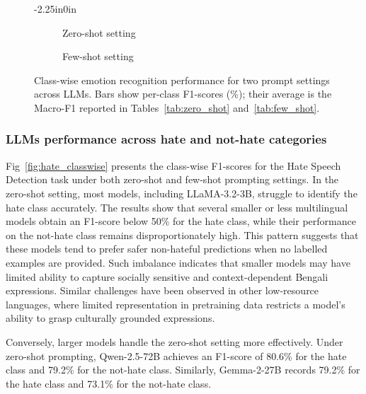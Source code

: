 \documentclass[10pt,letterpaper]{article}
\begin{document}
\begin{figure}[t]
\begin{adjustwidth}{-2.25in}{0in}
    \centering
    \begin{subfigure}{0.7\textwidth}
        \centering
        \caption{Zero-shot setting}
        \label{fig:emo_zero}
    \end{subfigure}
    \hfill
    \begin{subfigure}{0.7\textwidth}
        \centering
        \caption{Few-shot setting}
        \label{fig:emo_few}
    \end{subfigure}
    \caption{Class-wise emotion recognition performance for two prompt settings across LLMs. Bars show per-class F1-scores (\%); their average is the Macro-F1 reported in Tables~\ref{tab:zero_shot} and~\ref{tab:few_shot}.}
    \label{fig:emo_classwise}
\end{adjustwidth}
\end{figure}

\subsubsection*{LLMs performance across hate and not-hate categories}
\label{sec:hate_classwise}

Fig~\ref{fig:hate_classwise} presents the class-wise F1-scores for the Hate Speech Detection task under both zero-shot and few-shot prompting settings. In the zero-shot setting, most models, including LLaMA-3.2-3B, struggle to identify the hate class accurately. The results show that several smaller or less multilingual models obtain an F1-score below 50\% for the hate class, while their performance on the not-hate class remains disproportionately high. This pattern suggests that these models tend to prefer safer non-hateful predictions when no labelled examples are provided. Such imbalance indicates that smaller models may have limited ability to capture socially sensitive and context-dependent Bengali expressions. Similar challenges have been observed in other low-resource languages, where limited representation in pretraining data restricts a model's ability to grasp culturally grounded expressions.

Conversely, larger models handle the zero-shot setting more effectively. Under zero-shot prompting, Qwen-2.5-72B achieves an F1-score of 80.6\% for the hate class and 79.2\% for the not-hate class. Similarly, Gemma-2-27B records 79.2\% for the hate class and 73.1\% for the not-hate class.
\end{document}

